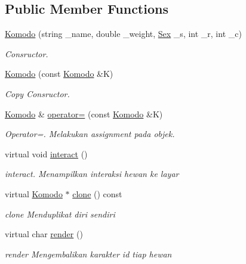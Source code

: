 \subsection*{Public Member Functions}
\begin{DoxyCompactItemize}
\item 
\hyperlink{classKomodo_a12511c3d4d7ce72ca541ab186afa1675}{Komodo} (string \+\_\+name, double \+\_\+weight, \hyperlink{sex_8h_a2633cb393c68bb2ee8080db58fb7ba93}{Sex} \+\_\+s, int \+\_\+r, int \+\_\+c)
\begin{DoxyCompactList}\small\item\em Consructor. \end{DoxyCompactList}\item 
\hyperlink{classKomodo_ad34e58c61b43c74e2d9a491da0c60f66}{Komodo} (const \hyperlink{classKomodo}{Komodo} \&K)
\begin{DoxyCompactList}\small\item\em Copy Consructor. \end{DoxyCompactList}\item 
\hyperlink{classKomodo}{Komodo} \& \hyperlink{classKomodo_a4ca2554dbb0e7b6af963721e4041e606}{operator=} (const \hyperlink{classKomodo}{Komodo} \&K)
\begin{DoxyCompactList}\small\item\em Operator=. Melakukan assignment pada objek. \end{DoxyCompactList}\item 
virtual void \hyperlink{classKomodo_a091e8c0374220bb60e86d55e52470efb}{interact} ()
\begin{DoxyCompactList}\small\item\em interact. Menampilkan interaksi hewan ke layar \end{DoxyCompactList}\item 
virtual \hyperlink{classKomodo}{Komodo} $\ast$ \hyperlink{classKomodo_a2b1b5b9e53444eb2aa9ac0784a492bae}{clone} () const 
\begin{DoxyCompactList}\small\item\em clone Menduplikat diri sendiri \end{DoxyCompactList}\item 
virtual char \hyperlink{classKomodo_a486c9f3aaf8a461692c2c2f65296a2a9}{render} ()
\begin{DoxyCompactList}\small\item\em render Mengembalikan karakter id tiap hewan \end{DoxyCompactList}\item 

\end{DoxyCompactItemize}
